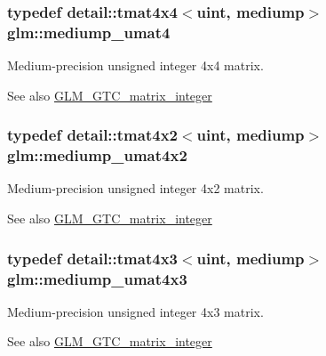 \subsubsection[{\texorpdfstring{mediump\+\_\+umat4}{mediump_umat4}}]{\setlength{\rightskip}{0pt plus 5cm}typedef detail\+::tmat4x4$<$uint, mediump$>$ {\bf glm\+::mediump\+\_\+umat4}}\hypertarget{group__gtc__matrix__integer_gac82f1c426fbca1c4989f0985eb7a4358}{}\label{group__gtc__matrix__integer_gac82f1c426fbca1c4989f0985eb7a4358}
Medium-\/precision unsigned integer 4x4 matrix. \begin{DoxySeeAlso}{See also}
\hyperlink{group__gtc__matrix__integer}{G\+L\+M\+\_\+\+G\+T\+C\+\_\+matrix\+\_\+integer} 
\end{DoxySeeAlso}
\subsubsection[{\texorpdfstring{mediump\+\_\+umat4x2}{mediump_umat4x2}}]{\setlength{\rightskip}{0pt plus 5cm}typedef detail\+::tmat4x2$<$uint, mediump$>$ {\bf glm\+::mediump\+\_\+umat4x2}}\hypertarget{group__gtc__matrix__integer_ga8ea45737e8bc9bfae2668968056b109f}{}\label{group__gtc__matrix__integer_ga8ea45737e8bc9bfae2668968056b109f}
Medium-\/precision unsigned integer 4x2 matrix. \begin{DoxySeeAlso}{See also}
\hyperlink{group__gtc__matrix__integer}{G\+L\+M\+\_\+\+G\+T\+C\+\_\+matrix\+\_\+integer} 
\end{DoxySeeAlso}
\subsubsection[{\texorpdfstring{mediump\+\_\+umat4x3}{mediump_umat4x3}}]{\setlength{\rightskip}{0pt plus 5cm}typedef detail\+::tmat4x3$<$uint, mediump$>$ {\bf glm\+::mediump\+\_\+umat4x3}}\hypertarget{group__gtc__matrix__integer_gaebe3b1b4b6030c096447e40fb00528f4}{}\label{group__gtc__matrix__integer_gaebe3b1b4b6030c096447e40fb00528f4}
Medium-\/precision unsigned integer 4x3 matrix. \begin{DoxySeeAlso}{See also}
\hyperlink{group__gtc__matrix__integer}{G\+L\+M\+\_\+\+G\+T\+C\+\_\+matrix\+\_\+integer} 
\end{DoxySeeAlso}
